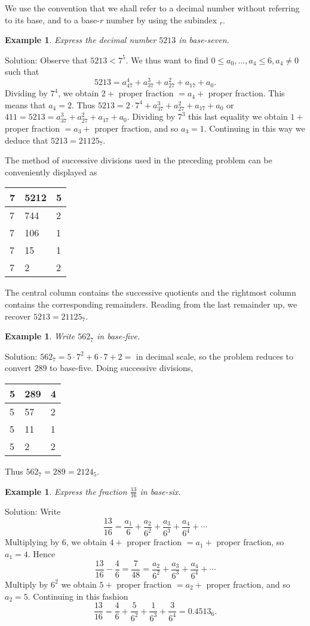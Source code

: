 \documentclass[11pt, openany]{book}
\theoremstyle{change} \theoremheaderfont{\blue\sffamily\bfseries}
\newtheorem{exa}[thm]{Example}
\theoremstyle{nonumberplain} \theoremheaderfont{\sffamily\bfseries}
\newcommand{\dis}{\displaystyle}
\newcommand{\í}{\'{\i}}
\begin{document}
We use the convention that we shall refer to a decimal number
without referring to its base, and to a base-$r$ number by using
the subindex $_r$.

\begin{exa}
Express the decimal number $5213$ in base-seven.
\end{exa}
Solution: Observe that $5213 < 7^5.$ We thus want to find $0 \leq
a_0, \ldots , a_4 \leq 6, a_4 \neq 0$ such that
$$5213 = a_47^4 + a_37^3 + a_27^2 + a_17 + a_0.$$Dividing by $7^4$, we obtain
$2 + $ proper fraction $= a_4 + $ proper fraction. This means that
$a_4 = 2.$ Thus $5213 = 2\cdot7^4 + a_37^3 + a_27^2 + a_17 + a_0$
or $411 = 5213 = a_37^3 + a_27^2 + a_17 + a_0$. Dividing by $7^3$
this last equality we obtain $1 + $ proper fraction $= a_3 + $
proper fraction, and so $a_3 = 1.$ Continuing in this way we
deduce that $5213 = 21125_7.$


The method of successive divisions used in the preceding problem
can be conveniently displayed as
\begin{center}
\begin{tabular}{l|l|l}
7 & 5212 & 5 \\
\hline
7 & 744 & 2 \\
\hline
7 & 106 & 1 \\
\hline
7 & 15 & 1 \\
\hline
7 & 2 & 2 \\

\end{tabular}
 \end{center}
The central column contains the successive quotients and the
rightmost column contains the corresponding remainders. Reading
from the last remainder up, we recover $5213 = 21125_7.$
\begin{exa}
Write $562_7$ in base-five.
\end{exa}
Solution: $562_7 = 5\cdot 7^2 + 6\cdot 7 + 2 = $ in decimal scale,
so the problem reduces to convert $289$ to base-five. Doing
successive divisions,
\begin{center}
\begin{tabular}{l|l|l}
5 & 289 & 4 \\
\hline
5 & 57 & 2 \\
\hline
5 & 11 & 1 \\
\hline
5 & 2 & 2 \\

\end{tabular}
 \end{center}Thus $562_7 = 289 = 2124_5.$
\begin{exa}
Express the fraction $\dis{\frac{13}{16}}$ in base-six.
\end{exa}
Solution: Write
$$\frac{13}{16} = \frac{a_1}{6} + \frac{a_2}{6^2} +  \frac{a_3}{6^3} +  \frac{a_4}{6^4} + \cdots  $$
Multiplying by 6, we obtain $4 + $ proper fraction $ = a_1 + $
proper fraction, so $a_1 = 4.$ Hence
$$\frac{13}{16} - \frac{4}{6} = \frac{7}{48} = \frac{a_2}{6^2} +  \frac{a_3}{6^3} +  \frac{a_4}{6^4} + \cdots $$
Multiply by $6^2$ we obtain $5 + $ proper fraction $= a_2 + $
proper fraction, and so $a_2 = 5.$ Continuing in this fashion
$$\frac{13}{16} = \frac{4}{6} + \frac{5}{6^2} +  \frac{1}{6^3} +  \frac{3}{6^4} = 0.4513_6.$$
\end{document}
